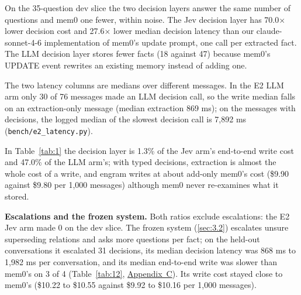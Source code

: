 \documentclass[11pt]{article}
\newcommand{\src}[1]{}
\begin{document}
On the 35\src{bench/results/e2\_jev\_\_dev.json}-question dev slice the two decision layers answer the same number of questions and mem0 one fewer, within noise. The Jev decision layer has 70.0$\times$\src{bench/results/e2\_llm\_\_dev.json ÷ bench/results/e2\_jev\_\_dev.json} lower decision cost and 27.6$\times$\src{bench/results/e2\_llm\_\_dev.json ÷ bench/results/e2\_jev\_\_dev.json} lower median decision latency than our claude-sonnet-4-6 implementation of mem0's update prompt, one call per extracted fact. The LLM decision layer stores fewer facts (18\src{bench/results/e2\_llm\_\_dev.json} against 47\src{bench/results/e2\_jev\_\_dev.json}) because mem0's UPDATE event rewrites an existing memory instead of adding one.

The two latency columns are medians over different messages. In the E2 LLM arm only 30\src{bench/results/e2\_latency.json} of 76\src{bench/results/e2\_latency.json} messages made an LLM decision call, so the write median falls on an extraction-only message (median extraction 869 ms\src{bench/results/e2\_latency.json}); on the messages with decisions, the logged median of the slowest decision call is 7,892 ms\src{bench/results/e2\_latency.json} (\texttt{bench/\allowbreak{}e2\_\allowbreak{}latency.py}).

In Table~\ref{tab:1} the decision layer is 1.3\%\src{bench/results/e2\_jev\_\_dev.json: decision $/1k ÷ total $/1k} of the Jev arm's end-to-end write cost and 47.0\%\src{bench/results/e2\_llm\_\_dev.json: decision $/1k ÷ total $/1k} of the LLM arm's; with typed decisions, extraction is almost the whole cost of a write, and engram writes at about add-only mem0's cost (\$9.90\src{bench/results/e2\_jev\_\_dev.json} against \$9.80\src{bench/results/mem0\_\_dev.json} per 1,000 messages) although mem0 never re-examines what it stored.

\textbf{Escalations and the frozen system.} Both ratios exclude escalations: the E2 Jev arm made 0\src{bench/results/e2\_jev\_\_dev.json} on the dev slice. The frozen system (\cref{sec:3.2}) escalates unsure superseding relations and asks more questions per fact; on the held-out conversations it escalated 31\src{bench/results/e4\_belief\_v2\_\_heldout\_conv-*\_\_k3.json} decisions, its median decision latency was 868 ms\src{bench/results/heldout\_report.json} to 1,982 ms\src{bench/results/heldout\_report.json} per conversation, and its median end-to-end write was slower than mem0's on 3\src{bench/results/heldout\_report.json: conversations where engram's write p50 exceeds mem0's} of 4\src{bench/results/heldout\_report.json} (Table~\ref{tab:12}, \hyperref[app:C]{Appendix~C}). Its write cost stayed close to mem0's (\$10.22\src{bench/results/heldout\_report.json} to \$10.55\src{bench/results/heldout\_report.json} against \$9.92\src{bench/results/heldout\_report.json} to \$10.16\src{bench/results/heldout\_report.json} per 1,000 messages).
\end{document}
